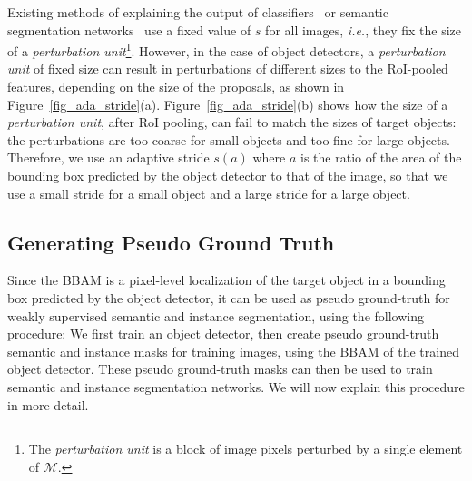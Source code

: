 \documentclass[final]{cvpr}
\begin{document}
Existing methods of explaining the output of classifiers~\cite{fong2017interpretable, fong2019understanding, dabkowski2017real} or semantic segmentation networks~\cite{hoyer2019grid} use a fixed value of $s$ for all images, \textit{i.e.}, they fix the size of a \textit{perturbation unit}\footnote{The \textit{perturbation unit} is a block of image pixels perturbed by a single element of $\mathcal{M}$.}.
However, in the case of object detectors, a \textit{perturbation unit} of fixed size can result in perturbations of different sizes to the RoI-pooled features, depending on the size of the proposals, as shown in Figure~\ref{fig_ada_stride}(a).
Figure~\ref{fig_ada_stride}(b) shows how the size of a \textit{perturbation unit}, after RoI pooling, can fail to match the sizes of target objects: the perturbations are too coarse for small objects and too fine for large objects.
Therefore, we use an adaptive stride $s(a)$ where $a$ is the ratio of the area of the bounding box predicted by the object detector to that of the image, so that we use a small stride for a small object and a large stride for a large object.


\subsection{Generating Pseudo Ground Truth}\label{method_weakly}
Since the BBAM is a pixel-level localization of the target object in a bounding box predicted by the object detector, it can be used as pseudo ground-truth for weakly supervised semantic and instance segmentation, using the following procedure:
We first train an object detector, then create pseudo ground-truth semantic and instance masks for training images, using the BBAM of the trained object detector. These pseudo ground-truth masks can then be used to train semantic and instance segmentation networks. We will now explain this procedure in more detail.
\end{document}
